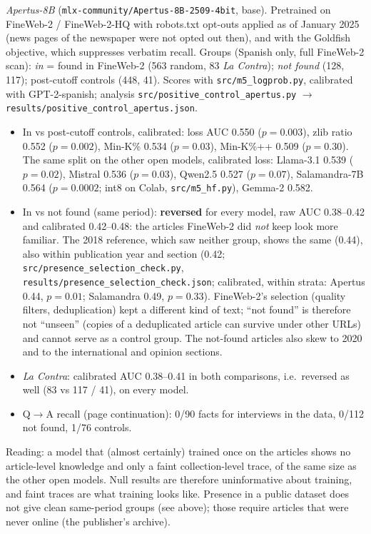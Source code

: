 \documentclass[10pt,a4paper]{article}
\begin{document}
\emph{Apertus-8B} (\texttt{mlx-community/Apertus-8B-2509-4bit}, base). Pretrained on FineWeb-2 / FineWeb-2-HQ with
robots.txt opt-outs applied as of January 2025 (news pages of the newspaper were not opted out then), and with the
Goldfish objective, which suppresses verbatim recall. Groups (Spanish only, full FineWeb-2 scan): \emph{in} = found in
FineWeb-2 (563 random, 83 \emph{La Contra}); \emph{not found} (128, 117); post-cutoff controls (448, 41). Scores with \texttt{src/m5\_logprob.py}, calibrated with GPT-2-spanish; analysis
\texttt{src/positive\_control\_apertus.py} $\rightarrow$ \texttt{results/positive\_control\_apertus.json}.
\begin{itemize}
\item In vs post-cutoff controls, calibrated: loss AUC 0.550 ($p=0.003$), zlib ratio 0.552 ($p=0.002$), Min-K\% 0.534
($p=0.03$), Min-K\%++ 0.509 ($p=0.30$). The same split on the other open models, calibrated loss: Llama-3.1 0.539
($p=0.02$), Mistral 0.536 ($p=0.03$), Qwen2.5 0.527 ($p=0.07$), Salamandra-7B 0.564 ($p=0.0002$; int8 on Colab,
\texttt{src/m5\_hf.py}), Gemma-2 0.582.
\item In vs not found (same period): \textbf{reversed} for every model, raw AUC 0.38--0.42 and calibrated 0.42--0.48:
the articles FineWeb-2 did \emph{not} keep look more familiar. The 2018 reference, which saw neither group, shows the
same (0.44), also within publication year and section (0.42; \texttt{src/presence\_selection\_check.py},
\texttt{results/presence\_selection\_check.json}; calibrated, within strata: Apertus 0.44, $p=0.01$; Salamandra 0.49,
$p=0.33$). FineWeb-2's selection (quality filters, deduplication) kept a different kind of text; ``not found'' is
therefore not ``unseen'' (copies of a deduplicated article can survive under other URLs) and cannot serve as a
control group. The not-found articles also skew to 2020 and to the international and opinion sections.
\item \emph{La Contra}: calibrated AUC 0.38--0.41 in both comparisons, i.e.\ reversed as well (83 vs 117 / 41), on
every model.
\item Q$\rightarrow$A recall (page continuation): 0/90 facts for interviews in the data, 0/112 not found, 1/76 controls.
\end{itemize}
Reading: a model that (almost certainly) trained once on the articles shows no article-level knowledge and only a faint
collection-level trace, of the same size as the other open models. Null results are therefore uninformative about
training, and faint traces are what training looks like. Presence in a public dataset does not give clean
same-period groups (see above); those require articles that were never online (the publisher's archive).
\end{document}
